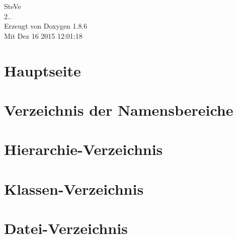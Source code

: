 \documentclass[twoside]{book}
\newcommand{\clearemptydoublepage}{%
  \newpage{\pagestyle{empty}\cleardoublepage}%
}
\begin{document}
\hypersetup{pageanchor=false}
\begin{titlepage}
\vspace*{7cm}
\begin{center}%
{\Large Ste\-Ve \\[1ex]\large 2.. }\\
\vspace*{1cm}
{\large Erzeugt von Doxygen 1.8.6}\\
\vspace*{0.5cm}
{\small Mit Dez 16 2015 12:01:18}\\
\end{center}
\end{titlepage}
\clearemptydoublepage
\tableofcontents
\clearemptydoublepage
{}
\hypersetup{pageanchor=true}

\chapter{Hauptseite}
\label{index}\hypertarget{index}{}
\chapter{Verzeichnis der Namensbereiche}

\chapter{Hierarchie-\/\-Verzeichnis}

\chapter{Klassen-\/\-Verzeichnis}

\chapter{Datei-\/\-Verzeichnis}

\end{document}
